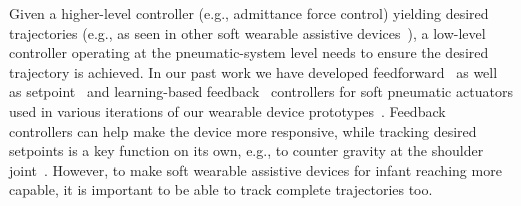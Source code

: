 \documentclass[letterpaper, 10pt, conference]{ieeeconf}      %
\newcommand{\changed}[1]{{\color{red}{#1}}}
\begin{document}

Given a higher-level controller (e.g., admittance force control) %
yielding desired trajectories %
(e.g., as seen in other soft wearable assistive devices~\cite{zhou2021human}), 
%
a low-level controller operating at the pneumatic-system level needs to ensure the desired trajectory is achieved. 
%
In our past work we have developed feedforward~\cite{kokkoni2020development,liu2021position} as well as setpoint~\cite{mucchiani2022closed} and learning-based feedback~\cite{shi2022online} controllers for soft pneumatic actuators used in various iterations of our wearable device prototypes~\cite{kokkoni2020development,sahin2022bidirectional}. Feedback controllers can help make the device more responsive, while tracking desired setpoints is a key function on its own, e.g., to counter gravity at the shoulder joint~\cite{proietti2021sensing}. However, to make soft wearable assistive devices for infant reaching more capable, it is important to be able to track complete trajectories too. %
%
\end{document}
